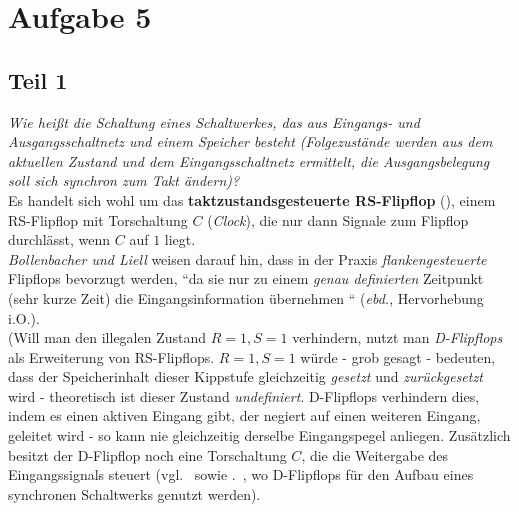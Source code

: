 \chapter{Aufgabe 5}

\section{Teil 1}


\textit{Wie heißt die Schaltung eines Schaltwerkes, das aus Eingangs- und
Ausgangsschaltnetz und einem Speicher besteht (Folgezustände werden
aus dem aktuellen Zustand und dem Eingangsschaltnetz ermittelt, die
Ausgangsbelegung soll sich synchron zum Takt ändern)?}\\

\noindent
Es handelt sich wohl um das \textbf{taktzustandsgesteuerte RS-Flipflop} (\cite[65 f.]{ES1}), einem RS-Flipflop mit Torschaltung $C$ (\textit{Clock}), die nur dann Signale zum Flipflop durchlässt, wenn $C$ auf $1$ liegt.\\
\textit{Bollenbacher und Liell} weisen darauf hin, dass in der Praxis \textit{flankengesteuerte} Flipflops bevorzugt werden, ``da sie nur zu einem \textit{genau definierten} Zeitpunkt (sehr kurze Zeit) die Eingangsinformation übernehmen `` (\textit{ebd.}, Hervorhebung i.O.).\\

\noindent
(Will man den illegalen Zustand $R=1, S=1$ verhindern, nutzt man \textit{D-Flipflops} als Erweiterung von RS-Flipflops. $R=1, S=1$ würde - grob gesagt - bedeuten, dass der Speicherinhalt dieser Kippstufe gleichzeitig \textit{gesetzt} und \textit{zurückgesetzt} wird - theoretisch ist dieser Zustand \textit{undefiniert}.
D-Flipflops verhindern dies, indem es einen aktiven Eingang gibt, der negiert auf einen weiteren Eingang, geleitet wird - so kann nie gleichzeitig derselbe Eingangspegel anliegen.
Zusätzlich besitzt der D-Flipflop noch eine Torschaltung $C$, die die Weitergabe des Eingangssignals steuert (vgl.~\cite[69]{ES1} sowie .~\cite[69]{ES1}, wo D-Flipflops für den Aufbau eines synchronen Schaltwerks genutzt werden).